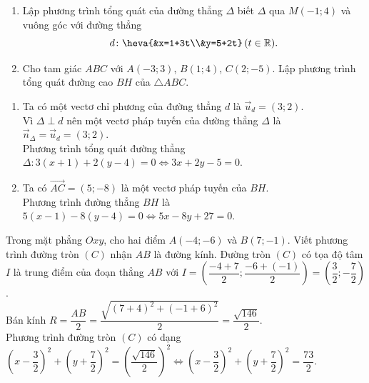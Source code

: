 \begin{ex}%
\begin{enumerate}
\item Lập phương trình tổng quát của đường thẳng $\Delta$ biết $\Delta$ qua $M(-1;4)$ và vuông góc với đường thẳng \[d\colon\heva{&x=1+3t\\&y=5+2t}\,(t \in \mathbb{R}).\]
\item Cho tam giác $ABC$ với $A(-3;3)$, $B(1;4)$, $C(2;-5)$. Lập phương trình tổng quát đường cao $BH$ của $\triangle ABC$.
\end{enumerate}
\loigiai
{
\begin{enumerate}
\item Ta có một vectơ chỉ phương của đường thẳng $d$ là $\overrightarrow{u}_d=(3;2)$.\\
Vì $\Delta \perp d$ nên một vectơ pháp tuyến của đường thẳng $\Delta$ là $\overrightarrow{n}_\Delta=\overrightarrow{u}_d=(3;2)$.\\
Phương trình tổng quát đường thẳng $\Delta\colon 3(x+1)+2(y-4)=0 \Leftrightarrow 3x+2y-5=0$.
\item Ta có $\overrightarrow{AC}=(5;-8)$ là một vectơ pháp tuyến của $BH$.\\
Phương trình đường thẳng $BH$ là
$5(x-1)-8(y-4)=0\Leftrightarrow 5x-8y+27=0$.
\end{enumerate}
}
\end{ex}

\begin{ex}%
Trong mặt phẳng $Oxy$, cho hai điểm $A(-4; -6)$ và $B(7; -1)$. Viết phương trình đường tròn $(C)$ nhận $AB$ là đường kính.
\loigiai
{
Đường tròn $(C)$ có tọa độ tâm $I$ là trung điểm của đoạn thẳng $AB$ với $I=\left(\dfrac{-4+7}{2};\dfrac{-6+(-1)}{2}\right)=\left(\dfrac{3}{2};-\dfrac{7}{2}\right)$.\\
Bán kính $R=\dfrac{AB}{2}=\dfrac{\sqrt{(7+4)^2+(-1+6)^2}}{2}=\dfrac{\sqrt{146}}{2}$.\\
Phương trình đường tròn $(C)$ có dạng
$\left(x-\dfrac{3}{2}\right)^2+\left(y+\dfrac{7}{2}\right)^2=\left(\dfrac{\sqrt{146}}{2}\right)^2\Leftrightarrow \left(x-\dfrac{3}{2}\right)^2+\left(y+\dfrac{7}{2}\right)^2=\dfrac{73}{2}.$
}
\end{ex}

